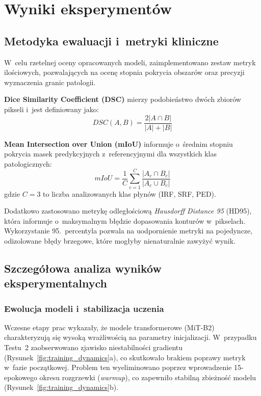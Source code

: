 \documentclass[12pt,a4paper,oneside]{report}
\begin{document}
\chapter{Wyniki eksperymentów}

\section{Metodyka ewaluacji i~metryki kliniczne}

W~celu rzetelnej oceny opracowanych modeli, zaimplementowano zestaw metryk ilościowych, pozwalających na ocenę stopnia pokrycia obszarów oraz precyzji wyznaczenia granic patologii.

\textbf{Dice Similarity Coefficient (DSC)} mierzy podobieństwo dwóch zbiorów pikseli i~jest definiowany jako:
\begin{equation}
    DSC(A, B) = \frac{2 |A \cap B|}{|A| + |B|}
\end{equation}

\textbf{Mean Intersection over Union (mIoU)} informuje o~średnim stopniu pokrycia masek predykcyjnych z~referencyjnymi dla wszystkich klas patologicznych:
\begin{equation}
    mIoU = \frac{1}{C} \sum_{c=1}^C \frac{|A_c \cap B_c|}{|A_c \cup B_c|}
\end{equation}
gdzie $C=3$ to liczba analizowanych klas płynów (IRF, SRF, PED).

Dodatkowo zastosowano metrykę odległościową \textit{Hausdorff Distance 95} (HD95), która informuje o~maksymalnym błędzie dopasowania konturów w~pikselach. Wykorzystanie 95.\ percentyla pozwala na uodpornienie metryki na pojedyncze, odizolowane błędy brzegowe, które mogłyby nienaturalnie zawyżyć wynik.

\section{Szczegółowa analiza wyników eksperymentalnych}

\subsection{Ewolucja modeli i~stabilizacja uczenia}
Wczesne etapy prac wykazały, że modele transformerowe (MiT-B2) charakteryzują się wysoką wrażliwością na parametry inicjalizacji. W~przypadku Testu~2 zaobserwowano zjawisko niestabilności gradientu (Rysunek~\ref{fig:training_dynamics}a), co skutkowało brakiem poprawy metryk w~fazie początkowej. Problem ten wyeliminowano poprzez wprowadzenie 15-epokowego okresu rozgrzewki (\textit{warmup}), co zapewniło stabilną zbieżność modelu (Rysunek~\ref{fig:training_dynamics}b).
\end{document}

